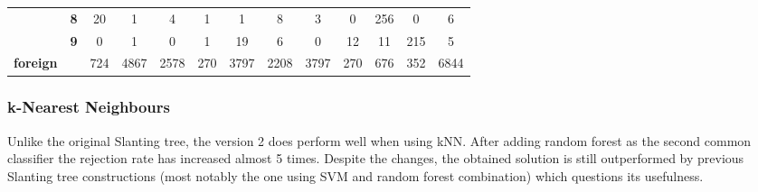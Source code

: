 \begin{table}[htp]
{\begin{tabular}{|c|c|c|c|c|c|c|c|c|c|c|c|c|}
		& \textbf{8} & 20         & 1          & 4          & 1          & 1          & 8          & 3          & 0          & 256        & 0          & 6                \\ \cline{2-13} 
		& \textbf{9} & 0          & 1          & 0          & 1          & 19         & 6          & 0          & 12         & 11         & 215        & 5                \\ \hline
		\textbf{foreign}                    & \textbf{}  & 724        & 4867       & 2578       & 270        & 3797       & 2208       & 3797       & 270        & 676        & 352        & 6844             \\ \hline
	\end{tabular}
}
\end{table}

\subsubsection{k-Nearest Neighbours}

Unlike the original Slanting tree, the version 2 does perform well when using kNN. After adding random forest as the second common classifier the rejection rate has increased almost 5 times. Despite the changes, the obtained solution is still outperformed by previous Slanting tree constructions (most notably the one using SVM and random forest combination) which questions its usefulness. 

